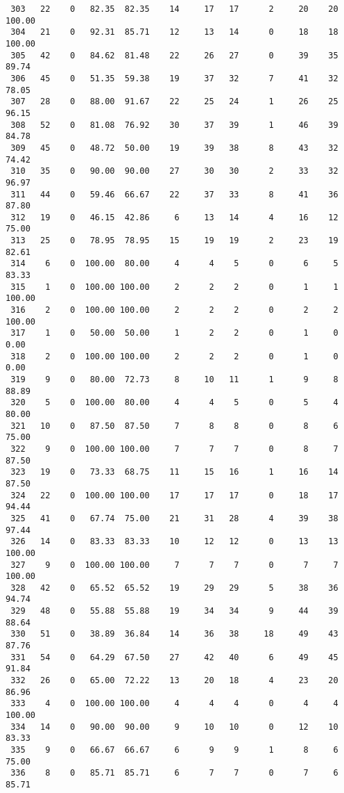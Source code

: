 \begin{verbatim}
 303   22    0   82.35  82.35    14     17   17      2     20    20   100.00
 304   21    0   92.31  85.71    12     13   14      0     18    18   100.00
 305   42    0   84.62  81.48    22     26   27      0     39    35    89.74
 306   45    0   51.35  59.38    19     37   32      7     41    32    78.05
 307   28    0   88.00  91.67    22     25   24      1     26    25    96.15
 308   52    0   81.08  76.92    30     37   39      1     46    39    84.78
 309   45    0   48.72  50.00    19     39   38      8     43    32    74.42
 310   35    0   90.00  90.00    27     30   30      2     33    32    96.97
 311   44    0   59.46  66.67    22     37   33      8     41    36    87.80
 312   19    0   46.15  42.86     6     13   14      4     16    12    75.00
 313   25    0   78.95  78.95    15     19   19      2     23    19    82.61
 314    6    0  100.00  80.00     4      4    5      0      6     5    83.33
 315    1    0  100.00 100.00     2      2    2      0      1     1   100.00
 316    2    0  100.00 100.00     2      2    2      0      2     2   100.00
 317    1    0   50.00  50.00     1      2    2      0      1     0     0.00
 318    2    0  100.00 100.00     2      2    2      0      1     0     0.00
 319    9    0   80.00  72.73     8     10   11      1      9     8    88.89
 320    5    0  100.00  80.00     4      4    5      0      5     4    80.00
 321   10    0   87.50  87.50     7      8    8      0      8     6    75.00
 322    9    0  100.00 100.00     7      7    7      0      8     7    87.50
 323   19    0   73.33  68.75    11     15   16      1     16    14    87.50
 324   22    0  100.00 100.00    17     17   17      0     18    17    94.44
 325   41    0   67.74  75.00    21     31   28      4     39    38    97.44
 326   14    0   83.33  83.33    10     12   12      0     13    13   100.00
 327    9    0  100.00 100.00     7      7    7      0      7     7   100.00
 328   42    0   65.52  65.52    19     29   29      5     38    36    94.74
 329   48    0   55.88  55.88    19     34   34      9     44    39    88.64
 330   51    0   38.89  36.84    14     36   38     18     49    43    87.76
 331   54    0   64.29  67.50    27     42   40      6     49    45    91.84
 332   26    0   65.00  72.22    13     20   18      4     23    20    86.96
 333    4    0  100.00 100.00     4      4    4      0      4     4   100.00
 334   14    0   90.00  90.00     9     10   10      0     12    10    83.33
 335    9    0   66.67  66.67     6      9    9      1      8     6    75.00
 336    8    0   85.71  85.71     6      7    7      0      7     6    85.71

\end{verbatim}
